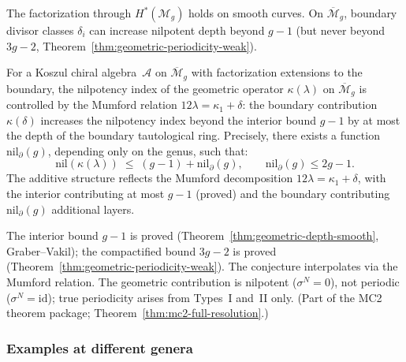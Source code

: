 \begin{remark}
\label{rem:factorization-hypothesis-geom}
The factorization through $H^*(\mathcal{M}_g)$ holds on smooth
curves.  On $\overline{\mathcal{M}}_g$, boundary divisor classes
$\delta_i$ can increase nilpotent depth beyond $g-1$ (but never
beyond $3g-2$, Theorem~\ref{thm:geometric-periodicity-weak}).
\end{remark}

\begin{conjecture}
\label{conj:geometric-periodicity}
For a Koszul chiral algebra~$\mathcal{A}$
on $\overline{\mathcal{M}}_g$
with factorization extensions to the boundary, the nilpotency
index of the geometric operator $\kappa(\lambda)$ on
$\overline{\mathcal{M}}_g$ is controlled by the Mumford
relation $12\lambda = \kappa_1 + \delta$:
the boundary contribution $\kappa(\delta)$ increases the
nilpotency index beyond the interior bound $g - 1$ by at most
the depth of the boundary tautological ring.  Precisely, there
exists a function $\mathrm{nil}_{\partial}(g)$, depending only
on the genus, such that:
\[
\mathrm{nil}(\kappa(\lambda)) \;\leq\; (g-1) + \mathrm{nil}_{\partial}(g),
\qquad \mathrm{nil}_{\partial}(g) \leq 2g - 1.
\]
The additive structure reflects the Mumford decomposition
$12\lambda = \kappa_1 + \delta$, with the interior contributing
at most $g - 1$ (proved) and the boundary contributing
$\mathrm{nil}_{\partial}(g)$ additional layers.
\end{conjecture}

\begin{remark}\label{rem:geometric-periodicity-scope}
The interior bound $g-1$ is proved
(Theorem~\ref{thm:geometric-depth-smooth}, Graber--Vakil); the
compactified bound $3g-2$ is proved
(Theorem~\ref{thm:geometric-periodicity-weak}).  The conjecture
interpolates via the Mumford relation.  The geometric contribution
is nilpotent ($\sigma^N = 0$), not periodic ($\sigma^N = \mathrm{id}$);
true periodicity arises from Types~I and~II only.
(Part of the MC2 theorem package; Theorem~\ref{thm:mc2-full-resolution}.)
\end{remark}

\subsubsection{Examples at different genera}

